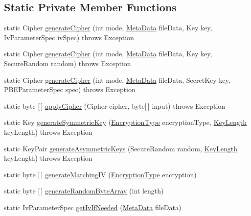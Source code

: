 \subsection*{Static Private Member Functions}
\begin{DoxyCompactItemize}
\item 
static Cipher \mbox{\hyperlink{classlogic_1_1_crypto_manager_abb2490bd6132789d350254da3864e768}{generate\+Cipher}} (int mode, \mbox{\hyperlink{classpersistence_1_1_meta_data}{Meta\+Data}} file\+Data, Key key, Iv\+Parameter\+Spec iv\+Spec)  throws Exception     
\item 
static Cipher \mbox{\hyperlink{classlogic_1_1_crypto_manager_ab826af05efd0cd4a8ad081af9adf4a51}{generate\+Cipher}} (int mode, \mbox{\hyperlink{classpersistence_1_1_meta_data}{Meta\+Data}} file\+Data, Key key, Secure\+Random random)  throws Exception     
\item 
static Cipher \mbox{\hyperlink{classlogic_1_1_crypto_manager_a54d442b4db4886dae8d6ec305f778797}{generate\+Cipher}} (int mode, \mbox{\hyperlink{classpersistence_1_1_meta_data}{Meta\+Data}} file\+Data, Secret\+Key key, P\+B\+E\+Parameter\+Spec spec)  throws Exception     
\item 
static byte \mbox{[}$\,$\mbox{]} \mbox{\hyperlink{classlogic_1_1_crypto_manager_acd250bd4f2301a12c018ad2bfb5f9831}{apply\+Cipher}} (Cipher cipher, byte\mbox{[}$\,$\mbox{]} input)  throws Exception 	
\item 
static Key \mbox{\hyperlink{classlogic_1_1_crypto_manager_ae9e89bef6dad93ba25682d76017437bf}{generate\+Symmetric\+Key}} (\mbox{\hyperlink{enumenums_1_1_encryption_type}{Encryption\+Type}} encryption\+Type, \mbox{\hyperlink{enumenums_1_1_key_length}{Key\+Length}} key\+Length)  throws Exception 	
\item 
static Key\+Pair \mbox{\hyperlink{classlogic_1_1_crypto_manager_a769894ae14be3ae193f48941fa38c460}{generate\+Asymmetric\+Keys}} (Secure\+Random random, \mbox{\hyperlink{enumenums_1_1_key_length}{Key\+Length}} key\+Length)  throws Exception 	
\item 
static byte \mbox{[}$\,$\mbox{]} \mbox{\hyperlink{classlogic_1_1_crypto_manager_ab2b0c505d44383d199f21aaa829290c4}{generate\+Matching\+IV}} (\mbox{\hyperlink{enumenums_1_1_encryption_type}{Encryption\+Type}} encryption)
\item 
static byte \mbox{[}$\,$\mbox{]} \mbox{\hyperlink{classlogic_1_1_crypto_manager_ab8b195435e4051b57895f72f4d3d1661}{generate\+Random\+Byte\+Array}} (int length)
\item 
static Iv\+Parameter\+Spec \mbox{\hyperlink{classlogic_1_1_crypto_manager_a2d1e7744033690a5eaaeed1e5a127485}{get\+Iv\+If\+Needed}} (\mbox{\hyperlink{classpersistence_1_1_meta_data}{Meta\+Data}} file\+Data)
\end{DoxyCompactItemize}
